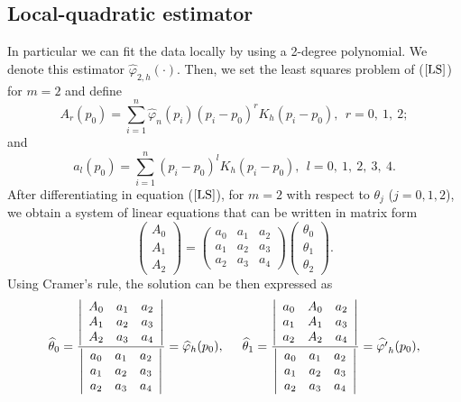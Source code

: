 \documentclass[preprint,12pt]{elsarticle}
\begin{document}
\subsection{Local-quadratic estimator}\label{quad}
\noindent In particular we can fit the data locally by using a 2-degree polynomial. We denote this estimator $\widehat{\varphi}_{2,h}(\cdot)$. Then, we set the least squares problem of ($\ref{LS}$) for $m=2$ and define 
\[
A_r(p_0)=\sum_{i=1}^n\widehat{\varphi}_n(p_i)(p_i-p_0)^r K_h(p_i-p_0), \ \ r=0, \ 1, \ 2;
\]
and 
\[
a_l(p_0)=\sum_{i=1}^n(p_i-p_0)^l K_h(p_i-p_0), \ \ l=0,\ 1, \ 2, \ 3, \ 4.
\]
After differentiating in equation ($\ref{LS}$), for $m=2$ with respect to $\theta_j$ ($j=0, 1, 2$), we obtain a system of linear equations that can be written in matrix form
\begin{equation}\label{score}
\left(\begin{array}{c} 
A_0 \\ 
A_1 \\ 
A_2
 \end{array}\right)
=\left(\begin{array}{ccc}
a_0 & a_1 &a_2 \\ 
a_1 & a_2 &a_3 \\ 
a_2 & a_3 &a_4 
\end{array}\right)
\left(\begin{array}{c}
 \theta_0 \\ 
\theta_1 \\ 
\theta_2
 \end{array}\right).
\end{equation}
Using  Cramer's rule, the solution can be then expressed as
\[
\widehat{\theta}_0=\frac{\left|
\begin{array}{ccc} 
A_0 & a_1 &a_2 \\ 
A_1 & a_2 &a_3 \\ 
A_2 & a_3 &a_4
 \end{array}\right|}
 {\left|\begin{array}{ccc} 
a_0 & a_1 &a_2 \\
 a_1 & a_2 &a_3 \\
 a_2 & a_3 &a_4
 \end{array}\right|}=\widehat{\varphi}_h(p_0),
\hspace{0.5cm}
\widehat{\theta}_1=\frac{\left|
\begin{array}{ccc} 
a_0 & A_0 &a_2 \\
 a_1 & A_1 & a_3 \\ 
a_2 & A_2 &a_4
 \end{array}\right|}
{\left|\begin{array}{ccc} 
a_0 & a_1 &a_2 \\ 
a_1 & a_2 &a_3 \\ 
a_2 & a_3 &a_4
 \end{array}\right|}=\widehat{\varphi'}_h(p_0),
\]
\end{document}
